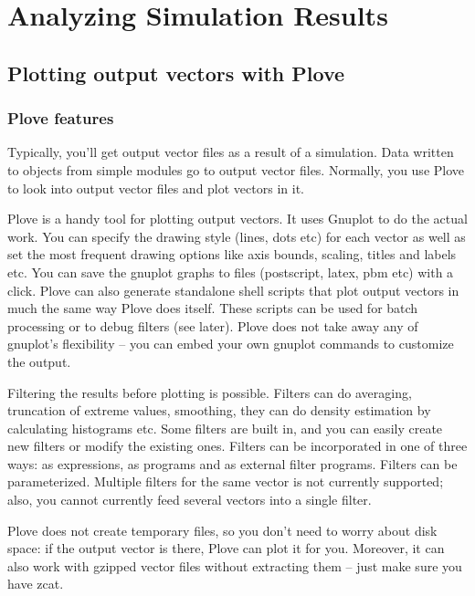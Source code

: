 \chapter{Analyzing Simulation Results}
\label{cha:analyzing-simulation-results}



\section{Plotting output vectors with Plove}

\subsection{Plove features}

Typically, you'll get output vector files as a result of a simulation.
Data written to  objects from
simple modules go to output vector
files. Normally, you use Plove to look
into output vector files and plot vectors in it.

Plove is a handy tool for plotting {\opp} output vectors.
It uses Gnuplot to do the actual work. You can specify
the drawing style (lines, dots etc) for each vector as well as set the
most frequent drawing options like axis bounds, scaling, titles and
labels etc. You can save the gnuplot graphs to files (postscript,
latex, pbm etc) with a click. Plove can also generate standalone shell
scripts that plot output vectors in much the same way Plove does
itself. These scripts can be used for batch processing or to debug
filters (see later). Plove does not take away any of gnuplot's
flexibility -- you can embed your own gnuplot commands to customize
the output.


Filtering the results before plotting is
possible. Filters can do averaging, truncation of extreme values,
smoothing, they can do density estimation by
calculating histograms etc. Some filters are built
in, and you can easily create new filters or modify the existing ones.
Filters can be incorporated in one of three ways: as  expressions,
as  programs and as external filter programs. Filters can be
parameterized. Multiple filters for the same vector is not currently
supported; also, you cannot currently feed several vectors into a
single filter.

Plove does not create temporary files, so you don't need to worry
about disk space: if the output vector is there, Plove can plot
it for you. Moreover, it can also work with gzipped vector files
without extracting them -- just make sure you have zcat.


